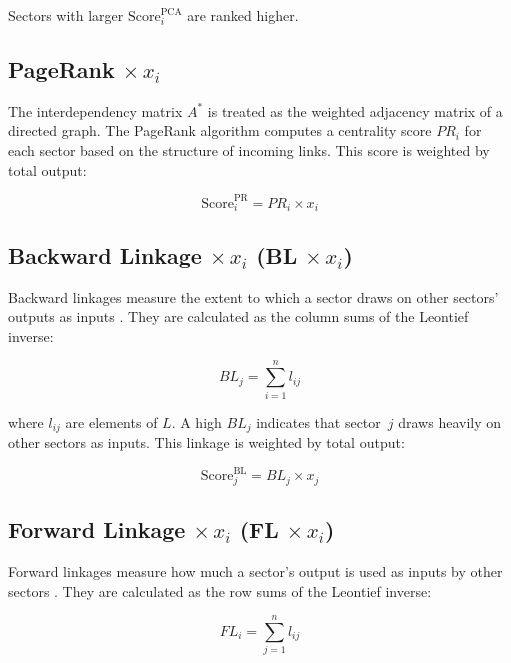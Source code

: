 Sectors with larger $\text{Score}_i^{\text{PCA}}$ are ranked higher.

\subsection{PageRank $\times\, x_i$}

The interdependency matrix $A^*$ is treated as the weighted adjacency matrix of a directed graph. The PageRank algorithm \cite{BrinPage1998} computes a centrality score $PR_i$ for each sector based on the structure of incoming links. This score is weighted by total output:

\begin{equation}
    \text{Score}_i^{\text{PR}} = PR_i \times x_i
    \label{eq:pagerank-xi}
\end{equation}

\subsection{Backward Linkage $\times\, x_i$ (BL $\times\, x_i$)}

Backward linkages measure the extent to which a sector draws on other sectors' outputs as inputs \cite{Rasmussen1956,Chenery1958}. They are calculated as the column sums of the Leontief inverse:

\begin{equation}
    BL_j = \sum_{i=1}^{n} l_{ij}
    \label{eq:backward-linkage}
\end{equation}

where $l_{ij}$ are elements of $L$. A high $BL_j$ indicates that sector~$j$ draws heavily on other sectors as inputs. This linkage is weighted by total output:

\begin{equation}
    \text{Score}_j^{\text{BL}} = BL_j \times x_j
\end{equation}

\subsection{Forward Linkage $\times\, x_i$ (FL $\times\, x_i$)}

Forward linkages measure how much a sector's output is used as inputs by other sectors \cite{Rasmussen1956,Dietzenbacher2002}. They are calculated as the row sums of the Leontief inverse:

\begin{equation}
    FL_i = \sum_{j=1}^{n} l_{ij}
    \label{eq:forward-linkage}
\end{equation}

